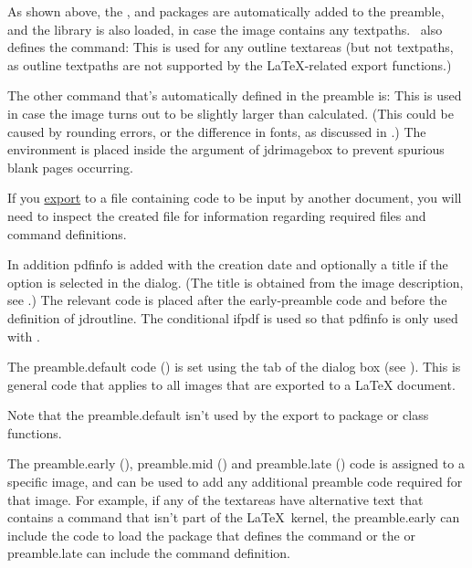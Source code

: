 As shown above, the ,  and
 packages are automatically added to the \gls{preamble},
and the   library is also
loaded, in case the image contains any \glspl{textpath}.
\FlowframTk\ also defines the command:
This is used for any outline \glspl{textarea} (but not
\glspl{textpath}, as outline \glspl*{textpath} are not supported by
the \LaTeX-related export functions.)

The other command that's automatically defined in the \gls{preamble} is:
This is used in case the image turns out to be slightly larger than
calculated. (This could be caused by rounding errors, or the
difference in fonts, as discussed in .)
The  environment is placed inside the argument of
\gls{jdrimagebox} to prevent spurious blank pages occurring.

\begin{information}
If you \hyperref[sec:exportpgf]{export} to a file containing 
code to be input by another document, you will need to inspect the 
created  file for information regarding required files and
command definitions.
\end{information}

In addition \gls{pdfinfo} is added with the creation date and
optionally a title if the  option
is selected in the  dialog.
(The title is obtained from the image description, see
.) The relevant code is placed
after the early-preamble code and before the definition of
\gls{jdroutline}. The conditional \gls{ifpdf} is used so
that \gls{pdfinfo} is only used with \pdfLaTeX.

The \gls{preamble.default} code () is set using the
 tab of the  dialog
box (see ). This is general code
that applies to all images that are exported to a LaTeX document.

\begin{information}
Note that the \gls{preamble.default} isn't used by the export to package
or class functions.
\end{information}

The \gls{preamble.early} (), 
\gls{preamble.mid} () and \gls{preamble.late}
() code is assigned to a specific image, and can
be used to add any additional \gls{preamble} code required for that image.
For example, if any of the \glspl{textarea} have alternative text
that contains a command that isn't part of the \LaTeX\ kernel, the
\gls{preamble.early} can include the code to load the package that defines
the command or the  or \gls{preamble.late} can include the command
definition.

